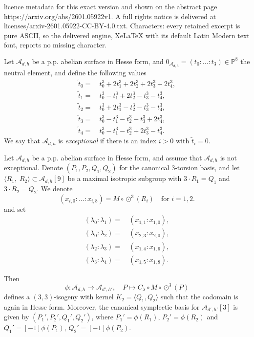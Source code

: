\documentclass[10pt,a4paper]{amsart}
\newcommand{\A}{\mathcal{A}}
\newcommand{\PP}{\mathbb{P}}
\newcommand{\cube}{\odot^3}
\begin{document}
licence metadata for this exact version and shown on the abstract page https://arxiv.org/abs/2601.05922v1. A full rights notice is delivered at licenses/arxiv-2601.05922-CC-BY-4.0.txt. Characters: every retained excerpt is pure ASCII, so the delivered engine, XeLaTeX with its default Latin Modern text font, reports no missing character.
\begin{definition}\label{def:exceptional}
    Let $\A_{d,h}$ be a p.p. abelian surface in Hesse form, and $0_{\A_{d,h}} = (t_0: \dots : t_3) \in \PP^8$ the neutral element, and define the following values 
    \begin{align*}
    \tilde{t}_0 =&~ t_0^3 + 2t_1^3 + 2t_2^3 + 2t_3^3 + 2t_4^3,\\
    \tilde{t}_1 =&~  t_0^3 - t_1^3 + 2t_2^3 - t_3^3 -t_4^3,\\
    \tilde{t}_2 = &~ t_0^3 + 2  t_1^3 - t_2^3 - t_3^3 -t_4^3,\\
    \tilde{t}_3 = &~ t_0^3 - t_1^3 - t_2^3 - t_3^3  +2 t_4^3,\\
    \tilde{t}_4 = &~ t_0^3 - t_1^3 - t_2^3 +2 t_3^3 - t_4^3.
    \end{align*}
    We say that $\A_{d,h}$ is {\em exceptional} if there is an index $i>0$ with $\tilde{t}_i = 0$.
\end{definition}

\begin{theorem} \label{thm:3-isogeny-dim2}
    Let $\A_{d,h}$ be a p.p. abelian surface in Hesse form, and assume that $\A_{d,h}$ is not exceptional. Denote $(P_1,P_2,Q_1,Q_2)$ for the canonical $3$-torsion basis, and let 
    \(
    \langle R_1, \; R_2\rangle \subset \A_{d,h}[9]
    \) be a maximal isotropic subgroup with $3 \cdot R_1  =  Q_1$ and $3 \cdot R_2  =  Q_2$. We denote
    \[
    (x_{i,0}:\dots: x_{i,8}) = M \circ \cube(R_i) \quad \text{for } i =1,2.
    \]
    and set 
    \begin{align*}
    (\lambda_0 : \lambda_1) =&~ (x_{1,1} :  x_{1,0}),
    \\
     (\lambda_0 : \lambda_2) =&~ (x_{2,3} :  x_{2,0}),
     \\
    (\lambda_2 : \lambda_3) =&~ (x_{1,4}: x_{1,6}),
    \\ 
    (\lambda_3 : \lambda_4) =&~ (x_{1,5} : x_{1,8}).  
    \end{align*}
    
    Then 
    \[
    \phi: \A_{d,h} \to \A_{d',h'}, \quad P \mapsto C_\lambda \circ M \circ \cube(P)
    \]
    defines a $(3,3)$-isogeny with kernel $K_2 = \langle Q_1, Q_2\rangle$ such that the codomain is again in Hesse form. Moreover, the canonical symplectic basis for $\A_{d',h'}[3]$ is given by  $(P_1',P_2',Q_1',Q_2')$, where $P_1' = \phi(R_1), \, P_2' = \phi(R_2)$ and $Q_1' = [-1]\phi(P_1), \, Q_2' = [-1]\phi(P_2)$. 
\end{theorem}
\end{document}
